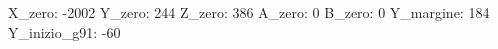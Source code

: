 X_zero:     -2002
Y_zero:       244
Z_zero:       386
A_zero:         0
B_zero:         0
Y_margine:    184
Y_inizio_g91: -60